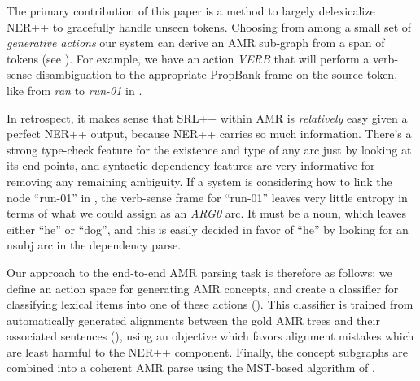 \documentclass[11pt]{article}
\newcommand\w[1]{\textit{#1}} %
\newcommand\n[1]{\textit{#1}} %
\begin{document}
The primary contribution of this paper is a method to largely delexicalize NER++ to gracefully handle unseen tokens.
Choosing from among a small set of \textit{generative actions} our system can derive an AMR sub-graph from a span of tokens (see ).
For example, we have an action \textit{VERB} that will perform a verb-sense-disambiguation to the appropriate PropBank frame \cite{palmer2005proposition-srl} on the source token, like from \w{ran} to \n{run-01} in .

In retrospect, it makes sense that SRL++ within AMR is \textit{relatively} easy given a perfect NER++ output, because NER++ carries so much information.
There's a strong type-check feature for the existence and type of any arc just by looking at its end-points, and syntactic dependency features are very informative for removing any remaining ambiguity.
If a system is considering how to link the node ``run-01'' in , the verb-sense frame for ``run-01'' leaves very little entropy in terms of what we could assign as an \w{ARG0} arc.
It must be a noun, which leaves either ``he'' or ``dog'', and this is easily decided in favor of ``he'' by looking for an nsubj arc in the dependency parse. 
%

Our approach to the end-to-end AMR parsing task is therefore as follows:
  we define an action space for generating AMR concepts, and create a classifier
  for classifying lexical items into one of these actions ().
This classifier is trained from automatically generated alignments between the
  gold AMR trees and their associated sentences (), using an
  objective which favors alignment mistakes which are least harmful to the NER++
  component.
Finally, the concept subgraphs are combined into a coherent AMR parse using the
  MST-based algorithm of .
\end{document}
